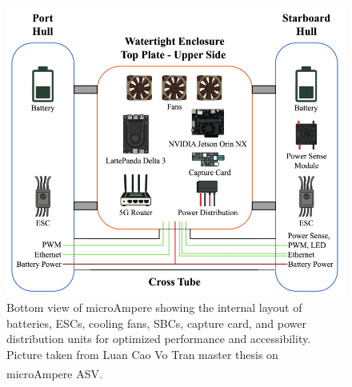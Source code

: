 \begin{figure}[H]
    \centering
    \includegraphics[width=0.7\linewidth]{Pictures/Hardware/Layout/BoatBottom.png}
    \caption{Bottom view of microAmpere showing the internal layout of batteries, ESCs, cooling fans, SBCs, capture card, and power distribution units for optimized performance and accessibility. Picture taken from Luan Cao Vo Tran master thesis on microAmpere ASV.\textsuperscript{\cite{microAmpere_hardware_master_thesis1}}}
    \label{fig:microAmpere-layout-bottom}
\end{figure}



\newpage



